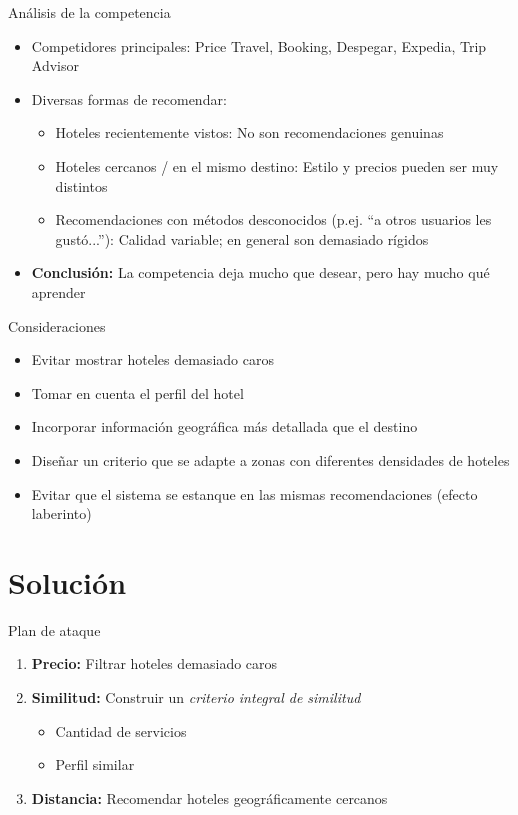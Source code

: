 \documentclass{beamer}
\begin{document}
\begin{frame}{Análisis de la competencia}
	\begin{itemize}%
		\item Competidores principales: Price Travel, Booking, Despegar, Expedia, Trip Advisor
		\item Diversas formas de recomendar:
		\begin{itemize}
			\item Hoteles recientemente vistos: No son recomendaciones genuinas
			\item Hoteles cercanos / en el mismo destino: Estilo y precios pueden ser muy distintos
			\item Recomendaciones con métodos desconocidos (p.ej. ``a otros usuarios les gustó...''): Calidad variable; en general son demasiado rígidos
		\end{itemize}
	\item \textbf{Conclusión:} La competencia deja mucho que desear, pero hay mucho qué aprender
	\end{itemize}
\end{frame}

\begin{frame}{Consideraciones}
	\begin{itemize}%
		\item Evitar mostrar hoteles demasiado caros
		\item Tomar en cuenta el perfil del hotel
		\item Incorporar información geográfica más detallada que el destino
		\item Diseñar un criterio que se adapte a zonas con diferentes densidades de hoteles
		\item Evitar que el sistema se estanque en las mismas recomendaciones (efecto laberinto)
	\end{itemize}
\end{frame}

\section{Solución}

\begin{frame}{Plan de ataque}
	\begin{enumerate}%
		\item \textbf{Precio:} Filtrar hoteles demasiado caros
		\item \textbf{Similitud:} Construir un \textit{criterio integral de similitud}
		\begin{itemize}
			\item Cantidad de servicios
			\item Perfil similar
		\end{itemize}
		\item \textbf{Distancia:} Recomendar hoteles geográficamente cercanos
	\end{enumerate}
\end{frame}
\end{document}
